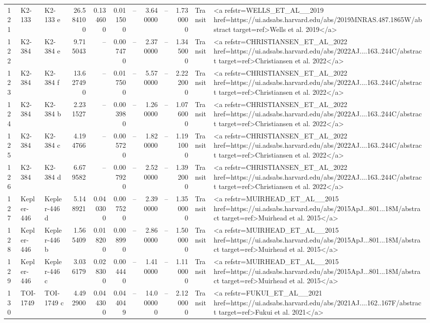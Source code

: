 \begin{tabular}{lllrrrrrrrll}
121 & K2-133 & K2-133 e & 26.584100 & 0.134600 & 0.011500 & -- & 3.640000 & -- & 1.730000 & Transit & <a refstr=WELLS_ET_AL__2019 href=https://ui.adsabs.harvard.edu/abs/2019MNRAS.487.1865W/abstract target=ref>Wells et al. 2019</a> \\
122 & K2-384 & K2-384 e & 9.715043 & -- & 0.007470 & -- & 2.370000 & -- & 1.345000 & Transit & <a refstr=CHRISTIANSEN_ET_AL_2022 href=https://ui.adsabs.harvard.edu/abs/2022AJ....163..244C/abstract target=ref>Christiansen et al. 2022</a> \\
123 & K2-384 & K2-384 f & 13.627490 & -- & 0.017500 & -- & 5.570000 & -- & 2.222000 & Transit & <a refstr=CHRISTIANSEN_ET_AL_2022 href=https://ui.adsabs.harvard.edu/abs/2022AJ....163..244C/abstract target=ref>Christiansen et al. 2022</a> \\
124 & K2-384 & K2-384 b & 2.231527 & -- & 0.003980 & -- & 1.260000 & -- & 1.076000 & Transit & <a refstr=CHRISTIANSEN_ET_AL_2022 href=https://ui.adsabs.harvard.edu/abs/2022AJ....163..244C/abstract target=ref>Christiansen et al. 2022</a> \\
125 & K2-384 & K2-384 c & 4.194766 & -- & 0.005720 & -- & 1.820000 & -- & 1.191000 & Transit & <a refstr=CHRISTIANSEN_ET_AL_2022 href=https://ui.adsabs.harvard.edu/abs/2022AJ....163..244C/abstract target=ref>Christiansen et al. 2022</a> \\
126 & K2-384 & K2-384 d & 6.679582 & -- & 0.007920 & -- & 2.520000 & -- & 1.392000 & Transit & <a refstr=CHRISTIANSEN_ET_AL_2022 href=https://ui.adsabs.harvard.edu/abs/2022AJ....163..244C/abstract target=ref>Christiansen et al. 2022</a> \\
127 & Kepler-446 & Kepler-446 d & 5.148921 & 0.040300 & 0.007520 & -- & 2.390000 & -- & 1.350000 & Transit & <a refstr=MUIRHEAD_ET_AL__2015 href=https://ui.adsabs.harvard.edu/abs/2015ApJ...801...18M/abstract target=ref>Muirhead et al. 2015</a> \\
128 & Kepler-446 & Kepler-446 b & 1.565409 & 0.018200 & 0.008990 & -- & 2.860000 & -- & 1.500000 & Transit & <a refstr=MUIRHEAD_ET_AL__2015 href=https://ui.adsabs.harvard.edu/abs/2015ApJ...801...18M/abstract target=ref>Muirhead et al. 2015</a> \\
129 & Kepler-446 & Kepler-446 c & 3.036179 & 0.028300 & 0.004440 & -- & 1.410000 & -- & 1.110000 & Transit & <a refstr=MUIRHEAD_ET_AL__2015 href=https://ui.adsabs.harvard.edu/abs/2015ApJ...801...18M/abstract target=ref>Muirhead et al. 2015</a> \\
130 & TOI-1749 & TOI-1749 c & 4.492900 & 0.044300 & 0.044049 & -- & 14.000000 & -- & 2.120000 & Transit & <a refstr=FUKUI_ET_AL__2021 href=https://ui.adsabs.harvard.edu/abs/2021AJ....162..167F/abstract target=ref>Fukui et al. 2021</a> \\

\end{tabular}
